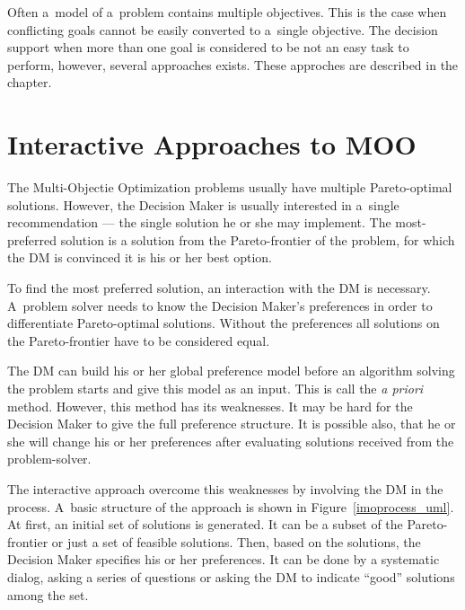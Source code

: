 Often a~model of a~problem contains multiple objectives. This is the case when
conflicting goals cannot be easily converted to a~single objective. The
decision support when more than one goal is considered to be not an easy task
to perform, however, several approaches exists. These approches are described
in the chapter.

\section{Interactive Approaches to MOO}
\label{sec_ia_in_moo}

The Multi-Objectie Optimization problems usually have multiple Pareto-optimal
solutions. However, the Decision Maker is usually interested in a~single
recommendation --- the single solution he or she may implement. The
most-preferred solution is a solution from the Pareto-frontier of the problem,
for which the DM is convinced it is his or her best option.

To find the most preferred solution, an interaction with the DM is
necessary. A~problem solver needs to know the Decision Maker's preferences in
order to differentiate Pareto-optimal solutions. Without the preferences all
solutions on the Pareto-frontier have to be considered equal.

The DM can build his or her global preference model before an algorithm
solving the problem starts and give this model as an input. This is call the
\textit{a priori} method. However, this method has its weaknesses. It may be
hard for the Decision Maker to give the full preference structure. It is
possible also, that he or she will change his or her preferences after
evaluating solutions received from the problem-solver. 

The interactive approach overcome this weaknesses by involving the DM in the
process. A~basic structure of the approach is shown in
Figure~\ref{imoprocess_uml}. At first, an initial set of solutions is
generated. It can be a subset of the Pareto-frontier or just a set of feasible
solutions. Then, based on the solutions, the Decision Maker specifies his or
her preferences. It can be done by a systematic dialog, asking a series of
questions or asking the DM to indicate ``good'' solutions among the set.

